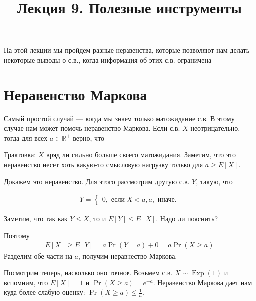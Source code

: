 \documentclass[12pt]{article}
\title{Лекция 9. Полезные инструменты}
\newcommand\R{\mathbb{R}}
\DeclareMathOperator{\Exp}{Exp}
\begin{document}
\maketitle

На этой лекции мы пройдем разные неравенства, которые позволяют нам делать некоторые выводы о с.в., когда информация об этих с.в. ограничена

\section{Неравенство Маркова}

Самый простой случай --- когда мы знаем только матожидание с.в. В этому случае нам может помочь неравенство Маркова. Если с.в. $X$ неотрицательно, тогда для всех $a \in \R^+$ верно, что 

\begin{center}
\end{center}

Трактовка: $X$ вряд ли сильно больше своего матожидания. Заметим, что это неравенство несет хоть какую-то смысловую нагрузку только для $a \ge E[X]$.

Докажем это неравенство. Для этого рассмотрим другую с.в. $Y$, такую, что

\begin{align*}
  Y = \begin{cases}
    0, \text{ если } X < a,
    a, \text{ иначе.}
  \end{cases}
\end{align*}

Заметим, что так как $Y \le X$, то и $E[Y] \le E[X]$. Надо ли пояснить?

Поэтому
\begin{align*}
  E[X] \ge E[Y] = a\Pr(Y = a) + 0 = a\Pr(X \ge a)
\end{align*}
Разделим обе части на $a$, получим неравнество Маркова.

Посмотрим теперь, насколько оно точное. Возьмем с.в. $X \sim \Exp(1)$ и вспомним, что $E[X] = 1$ и $\Pr(X \ge a) = e^{-a}$.
Неравенство Маркова дает нам куда более слабую оценку: $\Pr(X \ge a) \le \frac{1}{a}$.
\end{document}
